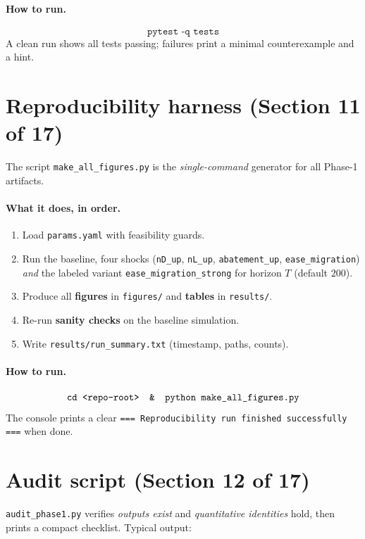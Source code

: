 \documentclass[12pt,a4paper]{article}
\newcommand{\code}[1]{\texttt{#1}}
\begin{document}
\paragraph{How to run.}
\[
\code{pytest\ -q\ tests}
\]
A clean run shows all tests passing; failures print a minimal counterexample and a hint.



\section{Reproducibility harness (Section 11 of 17)}
The script \code{make\_all\_figures.py} is the \emph{single-command} generator for all Phase-1 artifacts.

\paragraph{What it does, in order.}
\begin{enumerate}[leftmargin=1.5em]
  \item Load \code{params.yaml} with feasibility guards.
  \item Run the baseline, four shocks (\code{nD\_up}, \code{nL\_up}, \code{abatement\_up}, \code{ease\_migration}) \emph{and} the labeled variant \code{ease\_migration\_strong} for horizon $T$ (default $200$).
  \item Produce all \textbf{figures} in \code{figures/} and \textbf{tables} in \code{results/}.
  \item Re-run \textbf{sanity checks} on the baseline simulation.
  \item Write \code{results/run\_summary.txt} (timestamp, paths, counts).
\end{enumerate}

\paragraph{How to run.}
\[
\code{cd\ <repo-root>\quad \&\quad python\ make\_all\_figures.py}
\]
The console prints a clear \texttt{=== Reproducibility run finished successfully ===} when done.



\section{Audit script (Section 12 of 17)}
\code{audit\_phase1.py} verifies \emph{outputs exist} and \emph{quantitative identities} hold, then prints a compact checklist. Typical output:
\end{document}
